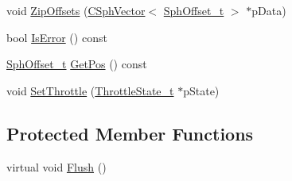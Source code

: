 \begin{DoxyCompactItemize}
\item 
void \hyperlink{classCSphWriter_a3e451619423ec7136b469f734e41f82c}{Zip\-Offsets} (\hyperlink{classCSphVector}{C\-Sph\-Vector}$<$ \hyperlink{sphinx_8h_a0fb3b64afebef33c61367714754eaa90}{Sph\-Offset\-\_\-t} $>$ $\ast$p\-Data)
\item 
bool \hyperlink{classCSphWriter_a82873454dce55dd4bb1a502f20bd2f69}{Is\-Error} () const 
\item 
\hyperlink{sphinx_8h_a0fb3b64afebef33c61367714754eaa90}{Sph\-Offset\-\_\-t} \hyperlink{classCSphWriter_a8bc8612c59fabd34ddbbf6855af4da89}{Get\-Pos} () const 
\item 
void \hyperlink{classCSphWriter_afced492f49e926bd4ef377793d16e9ca}{Set\-Throttle} (\hyperlink{structThrottleState__t}{Throttle\-State\-\_\-t} $\ast$p\-State)
\end{DoxyCompactItemize}
\subsection*{Protected Member Functions}
\begin{DoxyCompactItemize}
\item 
virtual void \hyperlink{classCSphWriter_a1a2e6bfe521039f4eb5453725b5a4162}{Flush} ()
\end{DoxyCompactItemize}
